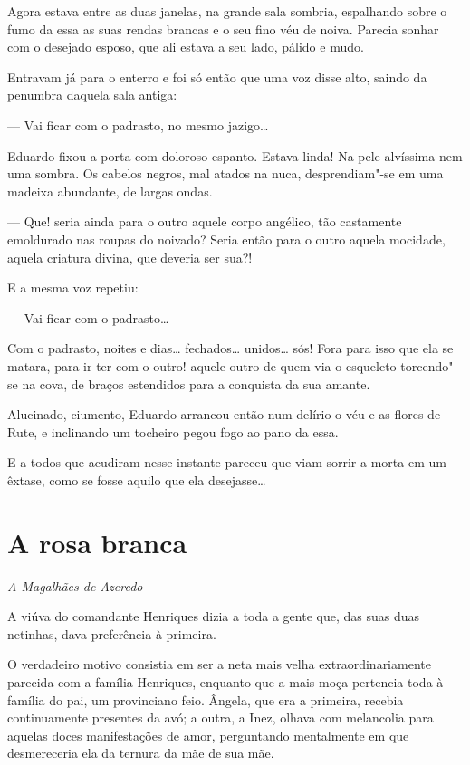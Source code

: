 Agora estava entre as duas janelas, na grande sala sombria, espalhando
sobre o fumo da essa as suas rendas brancas e o seu fino véu de noiva.
Parecia sonhar com o desejado esposo, que ali estava a seu lado, pálido
e mudo.

Entravam já para o enterro e foi só então que uma voz disse alto, saindo
da penumbra daquela sala antiga:

--- Vai ficar com o padrasto, no mesmo jazigo\ldots{}

Eduardo fixou a porta com doloroso espanto. Estava linda! Na pele
alvíssima nem uma sombra. Os cabelos negros, mal atados na nuca,
desprendiam"-se em uma madeixa abundante, de largas ondas.

--- Que! seria ainda para o outro aquele corpo angélico, tão castamente
emoldurado nas roupas do noivado? Seria então para o outro aquela
mocidade, aquela criatura divina, que deveria ser sua?!

E a mesma voz repetiu:

--- Vai ficar com o padrasto\ldots{}

Com o padrasto, noites e dias\ldots{} fechados\ldots{} unidos\ldots{} sós! Fora para
isso que ela se matara, para ir ter com o outro! aquele outro de quem
via o esqueleto torcendo"-se na cova, de braços estendidos para a
conquista da sua amante.

Alucinado, ciumento, Eduardo arrancou então num delírio o véu e as
flores de Rute, e inclinando um tocheiro pegou fogo ao pano da essa.

E a todos que acudiram nesse instante pareceu que viam sorrir a morta em
um êxtase, como se fosse aquilo que ela desejasse\ldots{}

\chapter{A rosa branca}

\hfill{}\emph{A Magalhães de Azeredo}

\bigskip

A viúva do comandante Henriques dizia a toda a gente que, das suas duas
netinhas, dava preferência à primeira.

O verdadeiro motivo consistia em ser a neta mais velha
extraordinariamente parecida com a família Henriques, enquanto que a
mais moça pertencia toda à família do pai, um provinciano feio. Ângela,
que era a primeira, recebia continuamente presentes da avó; a outra, a
Inez, olhava com melancolia para aquelas doces manifestações de amor,
perguntando mentalmente em que desmereceria ela da ternura da mãe de sua
mãe.

